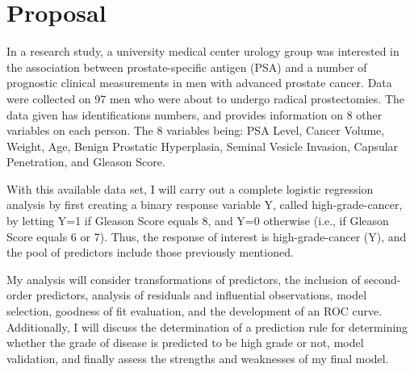%
%

\section{Proposal}
In a research study, a university medical center urology group was interested in the association between prostate-specific antigen (PSA) and a number of prognostic clinical measurements in men with advanced prostate cancer. Data were collected on 97 men who were about to undergo radical prostectomies. The data given has identifications numbers, and provides information on 8 other variables on each person. The 8 variables being: PSA Level, Cancer Volume, Weight, Age, Benign Prostatic Hyperplasia, Seminal Vesicle Invasion, Capsular Penetration, and Gleason Score. \par
With this available data set, I will carry out a complete logistic regression analysis by first creating a binary response variable Y, called high-grade-cancer, by letting Y=1 if Gleason Score equals 8, and Y=0 otherwise (i.e., if Gleason Score equals 6 or 7). Thus, the response of interest is high-grade-cancer (Y), and the pool of predictors include those previously mentioned. \par
My analysis will consider transformations of predictors, the inclusion of second-order predictors, analysis of residuals and influential observations, model selection, goodness of fit evaluation, and the development of an ROC curve. Additionally, I will discuss the determination of a prediction rule for determining whether the grade of disease is predicted to be high grade or not, model validation, and finally assess the strengths and weaknesses of my final model. \\
